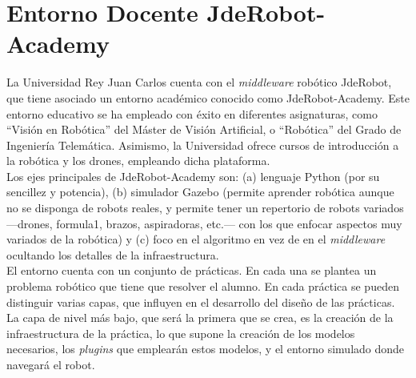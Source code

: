 \section{Entorno Docente JdeRobot-Academy}
La Universidad Rey Juan Carlos cuenta con el \textit{middleware} robótico JdeRobot, que tiene asociado un entorno académico conocido como JdeRobot-Academy. Este entorno educativo se ha empleado con éxito en diferentes asignaturas, como ``Visión en Robótica'' del Máster de Visión Artificial, o ``Robótica'' del Grado de Ingeniería Telemática. Asimismo, la Universidad ofrece cursos de introducción a la robótica y los drones, empleando dicha plataforma.\\

Los ejes principales de JdeRobot-Academy son: (a) lenguaje Python (por su sencillez y potencia), (b) simulador Gazebo (permite aprender robótica aunque no se disponga de robots reales, y permite tener un repertorio de robots variados ---drones, formula1, brazos, aspiradoras, etc.--- con los que enfocar aspectos muy variados de la robótica) y (c) foco en el algoritmo en vez de en el \textit{middleware} ocultando los detalles de la infraestructura.\\


El entorno cuenta con un conjunto de prácticas. En cada una se plantea un problema robótico que tiene que resolver el alumno. En cada práctica se pueden distinguir varias capas, que influyen en el desarrollo del diseño de las prácticas. La capa de nivel más bajo, que será la primera que se crea, es la creación de la infraestructura de la práctica, lo que supone la creación de los modelos necesarios, los \textit{plugins} que emplearán estos modelos, y el entorno simulado donde navegará el robot. \\

